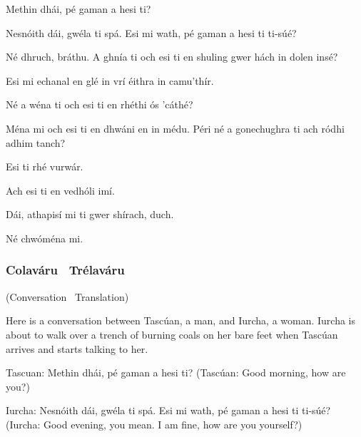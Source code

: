 \begingroup
\fontsize{10pt}{12pt}\selectfont
\begin{leftbubbles}Methin dh\'{a}i, p\'{e} gaman a hesi ti?\end{leftbubbles}
\begin{rightbubbles}Nesn\'{o}ith d\'{a}i, gw\'{e}la ti sp\'{a}. Esi mi wath, p\'{e} gaman a hesi ti ti-s\'{u}\'{e}?\end{rightbubbles}
\begin{leftbubbles}N\'{e} dhruch, br\'{a}thu. A ghn\'{i}a ti och esi ti en shuling gwer h\'{a}ch in dolen ins\'{e}?\end{leftbubbles}
\begin{rightbubbles}Esi mi echanal en gl\'{e} in vr\'{i} \'{e}ithra in camu'th\'{i}r.\end{rightbubbles}
\begin{leftbubbles}N\'{e} a w\'{e}na ti och esi ti en rh\'{e}thi \'{o}s 'c\'{a}th\'{e}?\end{leftbubbles}
\begin{rightbubbles}M\'{e}na mi och esi ti en dhw\'{a}ni en in m\'{e}du. P\'{e}ri n\'{e} a gonechughra ti ach r\'{o}dhi adhim tanch?\end{rightbubbles}
\begin{leftbubbles}Esi ti rh\'{e} vurw\'{a}r.\end{leftbubbles}
\begin{rightbubbles}Ach esi ti en vedh\'{o}li im\'{i}.\end{rightbubbles}
\begin{leftbubbles}D\'{a}i, athapis\'{i} mi ti gwer sh\'{i}rach, duch.\end{leftbubbles}
\begin{rightbubbles}N\'{e} chw\'{o}m\'{e}na mi.\end{rightbubbles}
\endgroup

\newpage
\subsubsection{Colav\'{a}ru \textendash\ Tr\'{e}lav\'{a}ru}
(Conversation \textendash\ Translation)

Here is a conversation between Tasc\'{u}an, a man, and Iurcha, a woman. Iurcha is about to walk over a trench of burning coals on her bare feet when Tasc\'{u}an arrives and starts talking to her.

Tascuan: Methin dh\'{a}i, p\'{e} gaman a hesi ti?
(Tasc\'{u}an: Good morning, how are you?)

Iurcha: Nesn\'{o}ith d\'{a}i, gw\'{e}la ti sp\'{a}. Esi mi wath, p\'{e} gaman a hesi ti ti-s\'{u}\'{e}?
(Iurcha: Good evening, you mean. I am fine, how are you yourself?)

